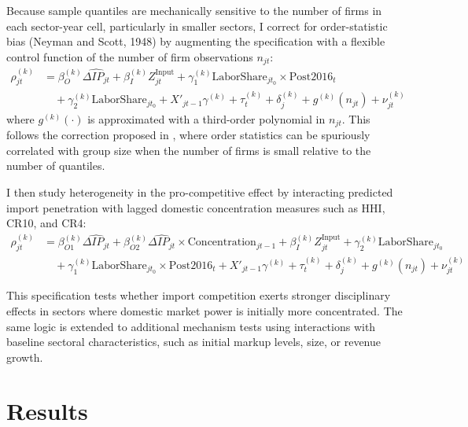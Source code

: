 \documentclass[12pt]{article}
\begin{document}
Because sample quantiles are mechanically sensitive to the number of firms in each sector-year cell, particularly in smaller sectors, I correct for order-statistic bias (Neyman and Scott, 1948) by augmenting the specification with a flexible control function of the number of firm observations $n_{jt}$:
\begin{equation}
\begin{aligned}
\rho_{jt}^{(k)} &= \beta_O^{(k)} \widehat{\Delta IP_{jt}} + \beta_I^{(k)} Z_{jt}^{\text{Input}} + \gamma_1^{(k)} \text{LaborShare}_{jt_0} \times \text{Post2016}_t \\
&\quad + \gamma_2^{(k)} \text{LaborShare}_{jt_0} + X'_{jt-1} \gamma^{(k)} + \tau_t^{(k)} + \delta_j^{(k)} + g^{(k)}(n_{jt}) + \nu_{jt}^{(k)}
\end{aligned}
\end{equation}
where $g^{(k)}(\cdot)$ is approximated with a third-order polynomial in $n_{jt}$. This follows the correction proposed in \textcite{backusWhyProductivityCorrelated2020}, where order statistics can be spuriously correlated with group size when the number of firms is small relative to the number of quantiles.

I then study heterogeneity in the pro-competitive effect by interacting predicted import penetration with lagged domestic concentration measures such as HHI, CR10, and CR4:
\begin{equation}
\begin{aligned}
\rho_{jt}^{(k)} &= \beta_{O1}^{(k)} \widehat{\Delta IP_{jt}} + \beta_{O2}^{(k)} \widehat{\Delta IP_{jt}} \times \text{Concentration}_{jt-1} + \beta_I^{(k)} Z_{jt}^{\text{Input}}  + \gamma_2^{(k)} \text{LaborShare}_{jt_0} \\
&\quad + \gamma_1^{(k)} \text{LaborShare}_{jt_0} \times \text{Post2016}_t + X'_{jt-1} \gamma^{(k)} + \tau_t^{(k)} + \delta_j^{(k)} + g^{(k)}(n_{jt}) + \nu_{jt}^{(k)}
\end{aligned}
\end{equation}

This specification tests whether import competition exerts stronger disciplinary effects in sectors where domestic market power is initially more concentrated. The same logic is extended to additional mechanism tests using interactions with baseline sectoral characteristics, such as initial markup levels, size, or revenue growth.

\section{Results}
\end{document}
